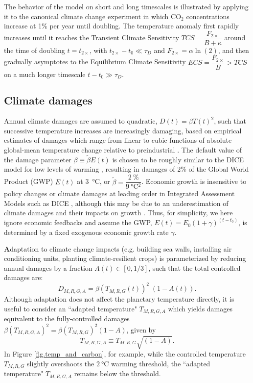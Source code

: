 \documentclass{article}
\begin{document}
The behavior of the model on short and long timescales is illustrated by applying it to the canonical climate change experiment in which CO$_{2}$ concentrations increase at 1\% per year until doubling. The temperature anomaly first rapidly increases until it reaches the Transient Climate Sensitivity $TCS = \dfrac{F_{2\times}}{B + \kappa}$ around the time of doubling $t=t_{2\times}$, with $t_{2\times} - t_{0} \ll \tau_{D}$ and $F_{2\times} = \alpha \ln(2)$, and then gradually asymptotes to the Equilibrium Climate Sensitivity $ECS = \dfrac{F_{2\times}}{B} > TCS$ on a much longer timescale $t-t_{0} \gg \tau_{D}$.

\subsection{Climate damages}

Annual climate damages are assumed to quadratic, $D(t) = \beta T(t)^{2}$, such that successive temperature increases are increasingly damaging, based on empirical estimates of damages which range from linear to cubic functions of absolute global-mean temperature change relative to preindustrial \citep{stern_economics_2007}. The default value of the damage parameter $\beta \equiv \tilde{\beta} E(t)$ is chosen to be roughly similar to the DICE model for low levels of warming \citep{nordhaus2013dice}, resulting in damages of $2\%$ of the Global World Product (GWP) $E(t)$ at \SI{3}{\celsius}, or $\tilde{\beta} = \dfrac{\SI{2}{\%}}{\SI{9}{\celsius^{2}}}$. Economic growth is insensitive to policy changes or climate damages at leading order in Integrated Assessment Models such as DICE \citep[see Figure 3 of][]{nordhaus2013dice}, although this may be due to an underestimation of climate damages and their impacts on growth \citep{burke_global_2015, glanemann_paris_2020}. Thus, for simplicity, we here ignore economic feedbacks and assume the GWP, $E(t) = E_{0}(1 + \gamma)^{(t-t_{0})}$, is determined by a fixed exogenous economic growth rate $\gamma$.

\textbf{A}daptation to climate change impacts (e.g. building sea walls, installing air conditioning units, planting climate-resilient crops) is parameterized by reducing annual damages by a fraction $A(t) \in [0, 1/3]$, such that the total controlled damages are:
\begin{equation}
    D_{M, R, G, A} = \beta (T_{M, R, G}(t))^{2} \; (1-A(t)).
\end{equation}
Although adaptation does not affect the planetary temperature directly, it is useful to consider an ``adapted temperature" $T_{M,R,G,A}$ which yields damages equivalent to the fully-controlled damages $\beta (T_{M,R,G,A})^{2} = \beta (T_{M,R,G})^{2} (1-A)$, given by
\begin{equation}
    T_{M,R,G,A} \equiv T_{M,R,G} \sqrt{(1-A)}.\label{eq.adapted_temperature}
\end{equation}
In Figure \ref{fig.temp_and_carbon}, for example, while the controlled temperature $T_{M,R,G}$ slightly overshoots the $\SI{2}{\celsius}$ warming threshold, the ``adapted temperature" $T_{M,R,G,A}$ remains below the threshold.
\end{document}
